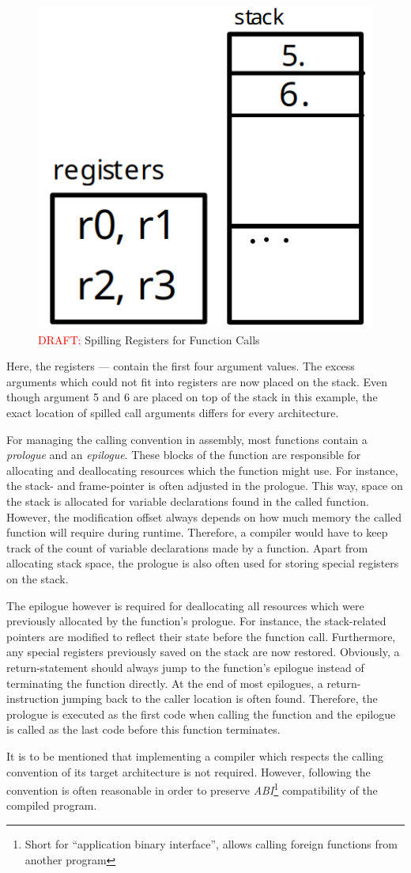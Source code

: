 \begin{figure}
	\centering
	\includegraphics[width=.2\textwidth]{./calling_convention_draft.png}
	\caption{\textcolor{red}{DRAFT:} Spilling Registers for Function Calls}\label{fig:call_conv_spill}
\end{figure}

Here, the registers  —  contain the first four argument values.
The excess arguments which could not fit into registers are now placed on the stack.
Even though argument 5 and 6 are placed on top of the stack in this example,
the exact location of spilled call arguments differs for every architecture.

For managing the calling convention in assembly, most functions contain a \emph{prologue} and an \emph{epilogue}.
These blocks of the function are responsible for allocating and deallocating resources which the function might use.
For instance, the stack- and frame-pointer is often adjusted in the prologue.
This way, space on the stack is allocated for variable declarations found in the called function.
However, the modification offset always depends on how much memory the called function will require during runtime.
Therefore, a compiler would have to keep track of the count of variable declarations made by a function.
Apart from allocating stack space, the prologue is also often used for storing special registers on the stack.

The epilogue however is required for deallocating all resources which were previously allocated by the function's prologue.
For instance, the stack-related pointers are modified to reflect their state before the function call.
Furthermore, any special registers previously saved on the stack are now restored.
Obviously, a return-statement should always jump to the function's epilogue instead of terminating the function directly.
At the end of most epilogues, a return-instruction jumping back to the caller location is often found.
Therefore, the prologue is executed as the first code when calling the function and the epilogue is called as the last code before this function terminates.

It is to be mentioned that implementing a compiler which respects the calling convention of its target architecture is not required.
However, following the convention is often reasonable in order to preserve \emph{ABI}\footnote{Short for \enquote{application binary interface}, allows calling foreign functions from another program} compatibility of the compiled program.
